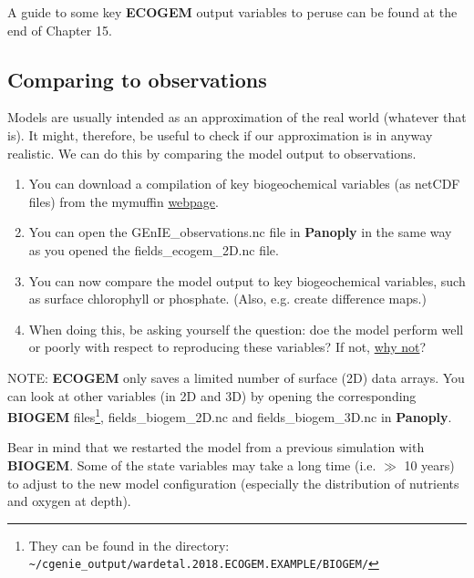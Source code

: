 \documentclass[11pt,fleqn]{book} %
\begin{document}
A guide to some key \textbf{ECOGEM} output variables to peruse can be found at the end of Chapter 15.


\subsection{Comparing to observations} 

Models are usually intended as an approximation of the real world (whatever that is). It might, therefore, be useful to check if our approximation is in anyway realistic. We can do this by comparing the model output to observations.

\begin{enumerate}[noitemsep]
\vspace{1mm}
\item You can download a compilation of key biogeochemical variables (as netCDF files) from the \textsf{\small mymuffin} \href{http://www.seao2.info/cgenie/data/GEnIE_observations.nc}{webpage}.
\vspace{1mm}
\item You can open the \textsf{\small GEnIE\_observations.nc} file in \textbf{Panoply} in the same way as you opened the \textsf{\small fields\_ecogem\_2D.nc} file.
\vspace{1mm}
\item You can now compare the model output to key biogeochemical variables, such as surface chlorophyll or phosphate. (Also, e.g. create difference maps.)
\vspace{1mm}
\item When doing this, be asking yourself the question: doe the model perform well or poorly with respect to reproducing these variables? If not, \uline{why not}?
\end{enumerate}
\vspace{2mm}

\noindent NOTE: \textbf{ECOGEM} only saves a limited number of surface (2D) data arrays. You can look at other variables (in 2D and 3D) by opening the corresponding \textbf{BIOGEM} files\footnote{They can be found in the directory:
\\ \texttt{\textasciitilde{}/cgenie\_output/wardetal.2018.ECOGEM.EXAMPLE/BIOGEM/}}, \textsf{\small fields\_biogem\_2D.nc} and \textsf{\small fields\_biogem\_3D.nc} in \textbf{Panoply}.

\noindent Bear in mind that we restarted the model from a previous simulation with \textbf{BIOGEM}. Some of the state variables may take a long time (i.e. $\gg$ 10 years) to adjust to the new model configuration (especially the distribution of nutrients and oxygen at depth). 
\end{document}
